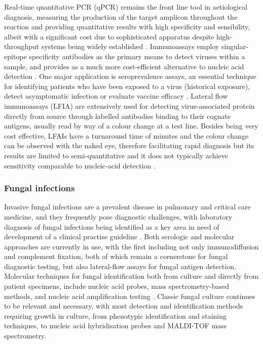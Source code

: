 Real-time quantitative PCR (qPCR) remains the front line tool in aetiological diagnosis, measuring the production of the target amplicon throughout the reaction and providing quantitative results with high specificity and sensibility, albeit with a significant cost due to sophisticated apparatus despite high-throughput systems being widely established \citep{cassedy_virus_2021}. Immunoassays employ singular-epitope specificity antibodies as the primary means to detect viruses within a sample, and provides as a much more cost-efficient alternative to nucleic acid detection \citep{cassedy_virus_2021}. One major application is seroprevalence assays, an essential technique for identifying patients who have been exposed to a virus (historical exposure), detect asymptomatic infection or evaluate vaccine efficacy  \citep{chan_determining_2021, bobrovitz_global_2021}. Lateral flow immunoassays (LFIA) are extensively used for detecting virus-associated protein directly from source through labelled antibodies binding to their cognate antigens, usually read by way of a colour change at a test line. Besides being very cost effective, LFAIs have a turnaround time of minutes and the colour change can be observed with the naked eye, therefore facilitating rapid diagnosis but its results are limited to semi-quantitative and it does not typically achieve sensitivity comparable to nucleic-acid detection \citep{estrela_lateral_2016, cassedy_virus_2021, di_nardo_ten_2021}.

\subsubsection{Fungal infections} \label{sssec:fungal}

Invasive fungal infections are a prevalent disease in pulmonary and critical care medicine, and they frequently pose diagnostic challenges, with laboratory diagnosis of fungal infections being identified as a key area in need of development of a clinical practise guideline \citep{haydour_diagnosis_2019}. Both serologic and molecular approaches are currently in use, with the first including not only immunodiffusion and complement fixation, both of which remain a cornerstone for fungal diagnostic testing, but also lateral-flow assays for fungal antigen detection. Molecular techniques for fungal identification both from culture and directly from patient specimens, include nucleic acid probes, mass spectrometry-based methods, and nucleic acid amplification testing \citep{ramanan_laboratory_2017}. Classic fungal culture continues to be relevant and necessary, with most detection and identification methods requiring growth in culture, from phenotypic identification and staining techniques, to nucleic acid hybridisation probes and MALDI-TOF mass spectrometry.  

